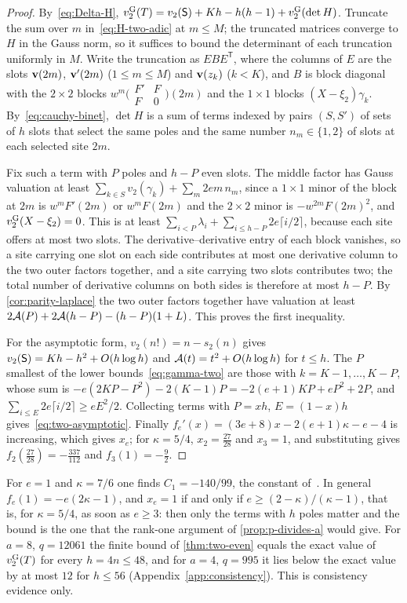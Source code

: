 \begin{proof}
By~\eqref{eq:Delta-H}, $v_{2}^{\mathrm{G}}(T)=v_2(\mathsf{S})+Kh-h(h-1)+v_{2}^{\mathrm{G}}(\det H)$. Truncate the sum over $m$
in~\eqref{eq:H-two-adic} at $m\le M$; the truncated matrices converge to $H$ in the Gauss norm,
so it suffices to bound the determinant of each truncation uniformly in $M$. Write the
truncation as $EBE^{\mathsf T}$, where the columns of $E$ are the slots $\mathbf{v}(2m)$,
$\mathbf{v}'(2m)$ ($1\le m\le M$) and $\mathbf{v}(z_k)$ ($k<K$), and $B$ is block diagonal with the
$2\times2$ blocks $w^m\bigl(\begin{smallmatrix}F'&F\\F&0\end{smallmatrix}\bigr)(2m)$ and the
$1\times1$ blocks $(X-\xi_2)\gamma_k$. By~\eqref{eq:cauchy-binet}, $\det H$ is a sum of terms
indexed by pairs $(S,S')$ of sets of $h$ slots that select the same poles and the same number
$n_m\in\{1,2\}$ of slots at each selected site $2m$.

Fix such a term with $P$ poles and $h-P$ even slots. The middle factor has Gauss valuation at
least $\sum_{k\in S}v_2(\gamma_k)+\sum_m2em\,n_m$, since a $1\times1$ minor of the block at $2m$
is $w^mF'(2m)$ or $w^mF(2m)$ and the $2\times2$ minor is $-w^{2m}F(2m)^2$, and
$v_{2}^{\mathrm{G}}(X-\xi_2)=0$. This is at least $\sum_{i<P}\lambda_i+\sum_{i\le h-P}2e\lceil i/2\rceil$,
because each site offers at most two slots. The derivative--derivative entry of each block
vanishes, so a site carrying one slot on each side contributes at most one derivative column to
the two outer factors together, and a site carrying two slots contributes two; the total number
of derivative columns on both sides is therefore at most $h-P$. By \cref{cor:parity-laplace} the
two outer factors together have valuation at least $2\mathcal{A}(P)+2\mathcal{A}(h-P)-(h-P)(1+L)$. This proves
the first inequality.

For the asymptotic form, $v_2(n!)=n-s_2(n)$ gives $v_2(\mathsf{S})=Kh-h^2+O(h\log h)$ and
$\mathcal{A}(t)=t^2+O(h\log h)$ for $t\le h$. The $P$ smallest of the lower
bounds~\eqref{eq:gamma-two} are those with $k=K-1,\dots,K-P$, whose sum is
$-e(2KP-P^2)-2(K-1)P=-2(e+1)KP+eP^2+2P$, and $\sum_{i\le E}2e\lceil i/2\rceil\ge eE^2/2$.
Collecting terms with $P=xh$, $E=(1-x)h$ gives~\eqref{eq:two-asymptotic}. Finally
$f_e'(x)=(3e+8)x-2(e+1)\kappa-e-4$ is increasing, which gives $x_e$; for $\kappa=5/4$,
$x_2=\frac{27}{28}$ and $x_3=1$, and substituting gives $f_2(\frac{27}{28})=-\frac{337}{112}$
and $f_3(1)=-\frac92$.
\end{proof}

\begin{remark}\label{rem:two-even-comparison}
For $e=1$ and $\kappa=7/6$ one finds $C_1=-140/99$, the constant
of~\cite{AxiomForge2026numeratorTwo}. In general $f_e(1)=-e(2\kappa-1)$, and
$x_e=1$ if and only if $e\ge(2-\kappa)/(\kappa-1)$, that is, for $\kappa=5/4$, as soon as
$e\ge3$: then only the terms with $h$ poles matter and the bound is the one that the rank-one
argument of \cref{prop:p-divides-a} would give. For $a=8$, $q=12061$ the finite bound of
\cref{thm:two-even} equals the exact value of $v_{2}^{\mathrm{G}}(T)$ for every $h=4n\le48$, and for $a=4$,
$q=995$ it lies below the exact value by at most $12$ for $h\le56$
(Appendix~\ref{app:consistency}). This is consistency evidence only.
\end{remark}
